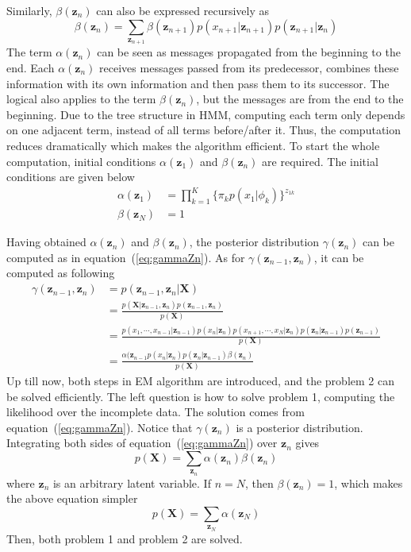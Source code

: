Similarly, \(\beta(\mathbf{z}_n)\) can also be expressed recursively as
\begin{equation}
	\beta(\mathbf{z}_n) = \sum_{\mathbf{z}_{n+1}}\beta(\mathbf{z}_{n+1})p(x_{n+1}|\mathbf{z}_{n+1})p(\mathbf{z}_{n+1}|\mathbf{z}_n)
\end{equation}
The term \(\alpha(\mathbf{z}_n)\) can be seen as messages propagated from the beginning to the end. Each \(\alpha(\mathbf{z}_n)\) receives messages passed from its predecessor, combines these information with its own information and then pass them to its successor. The logical also applies to the term \(\beta(\mathbf{z}_n)\), but the messages are from the end to the beginning. Due to the tree structure in HMM, computing each term only depends on one adjacent term, instead of all terms before/after it. Thus, the computation reduces dramatically which makes the algorithm efficient. To start the whole computation, initial conditions \(\alpha(\mathbf{z}_1)\) and \(\beta(\mathbf{z}_n)\) are required. The initial conditions are given below
\begin{align}
	\alpha(\mathbf{z}_1) &= \prod_{k=1}^{K}\{\pi_k p(x_1 | \phi_k) \}^{z_{1k}}	\\
	\beta(\mathbf{z}_N) &= 1
\end{align}

Having obtained \(\alpha(\mathbf{z}_n)\) and \(\beta(\mathbf{z}_n)\), the posterior distribution \(\gamma(\mathbf{z}_n)\) can be computed as in equation~(\ref{eq:gammaZn}). As for \(\gamma(\mathbf{z}_{n-1}, \mathbf{z}_n)\), it can be computed as following
\begin{align}
\gamma(\mathbf{z}_{n-1}, \mathbf{z}_n) &= p(\mathbf{z}_{n-1}, \mathbf{z}_n | \mathbf{X}) \nonumber \\
									   & = \frac{p(\mathbf{X} | \mathbf{z}_{n-1}, \mathbf{z}_n)p(\mathbf{z}_{n-1}, \mathbf{z}_n)}{p(\mathbf{X})}\nonumber \\
									   & = \frac{p(x_1, \cdots, x_{n-1} | \mathbf{z}_{n-1}) p(x_n | \mathbf{z}_n) p(x_{n+1}, \cdots, x_N | \mathbf{z}_n)
									   			 p(\mathbf{z}_n | \mathbf{z}_{n-1}) p(\mathbf{z}_{n-1})}{p(\mathbf{X})}\nonumber \\
									   & = \frac{\alpha(\mathbf{z}_{n-1}p(x_n|\mathbf{z}_n)p(\mathbf{z}_n|\mathbf{z}_{n-1})\beta(\mathbf{z}_n)}{p(\mathbf{X})}
\end{align}
Up till now, both steps in EM algorithm are introduced, and the problem 2 can be solved efficiently. The left question is how to solve problem 1, computing the likelihood over the incomplete data. The solution comes from  equation~(\ref{eq:gammaZn}). Notice that \(\gamma(\mathbf{z}_n)\) is a posterior distribution. Integrating both sides of equation~(\ref{eq:gammaZn}) over \(\mathbf{z}_n\) gives
\begin{equation}
	p(\mathbf{X}) = \sum_{\mathbf{z}_n} \alpha(\mathbf{z}_n)\beta(\mathbf{z}_n)
\end{equation}
where \(\mathbf{z}_n\) is an arbitrary latent variable. If \(n = N\), then \(\beta(\mathbf{z}_n) = 1\), which makes the above equation simpler
\begin{equation}
	p(\mathbf{X}) = \sum_{\mathbf{z}_N} \alpha(\mathbf{z}_N)
\end{equation}
Then, both problem 1 and problem 2 are solved.